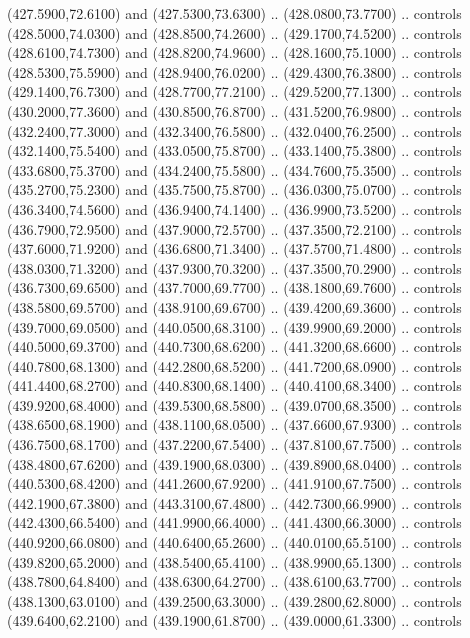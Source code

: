 {\begin{scope}[y=0.80pt, x=0.80pt, yscale=-1, xscale=1, inner sep=0pt, outer sep=0pt, #1]
      (427.5900,72.6100) and (427.5300,73.6300) .. (428.0800,73.7700) .. controls
      (428.5000,74.0300) and (428.8500,74.2600) .. (429.1700,74.5200) .. controls
      (428.6100,74.7300) and (428.8200,74.9600) .. (428.1600,75.1000) .. controls
      (428.5300,75.5900) and (428.9400,76.0200) .. (429.4300,76.3800) .. controls
      (429.1400,76.7300) and (428.7700,77.2100) .. (429.5200,77.1300) .. controls
      (430.2000,77.3600) and (430.8500,76.8700) .. (431.5200,76.9800) .. controls
      (432.2400,77.3000) and (432.3400,76.5800) .. (432.0400,76.2500) .. controls
      (432.1400,75.5400) and (433.0500,75.8700) .. (433.1400,75.3800) .. controls
      (433.6800,75.3700) and (434.2400,75.5800) .. (434.7600,75.3500) .. controls
      (435.2700,75.2300) and (435.7500,75.8700) .. (436.0300,75.0700) .. controls
      (436.3400,74.5600) and (436.9400,74.1400) .. (436.9900,73.5200) .. controls
      (436.7900,72.9500) and (437.9000,72.5700) .. (437.3500,72.2100) .. controls
      (437.6000,71.9200) and (436.6800,71.3400) .. (437.5700,71.4800) .. controls
      (438.0300,71.3200) and (437.9300,70.3200) .. (437.3500,70.2900) .. controls
      (436.7300,69.6500) and (437.7000,69.7700) .. (438.1800,69.7600) .. controls
      (438.5800,69.5700) and (438.9100,69.6700) .. (439.4200,69.3600) .. controls
      (439.7000,69.0500) and (440.0500,68.3100) .. (439.9900,69.2000) .. controls
      (440.5000,69.3700) and (440.7300,68.6200) .. (441.3200,68.6600) .. controls
      (440.7800,68.1300) and (442.2800,68.5200) .. (441.7200,68.0900) .. controls
      (441.4400,68.2700) and (440.8300,68.1400) .. (440.4100,68.3400) .. controls
      (439.9200,68.4000) and (439.5300,68.5800) .. (439.0700,68.3500) .. controls
      (438.6500,68.1900) and (438.1100,68.0500) .. (437.6600,67.9300) .. controls
      (436.7500,68.1700) and (437.2200,67.5400) .. (437.8100,67.7500) .. controls
      (438.4800,67.6200) and (439.1900,68.0300) .. (439.8900,68.0400) .. controls
      (440.5300,68.4200) and (441.2600,67.9200) .. (441.9100,67.7500) .. controls
      (442.1900,67.3800) and (443.3100,67.4800) .. (442.7300,66.9900) .. controls
      (442.4300,66.5400) and (441.9900,66.4000) .. (441.4300,66.3000) .. controls
      (440.9200,66.0800) and (440.6400,65.2600) .. (440.0100,65.5100) .. controls
      (439.8200,65.2000) and (438.5400,65.4100) .. (438.9900,65.1300) .. controls
      (438.7800,64.8400) and (438.6300,64.2700) .. (438.6100,63.7700) .. controls
      (438.1300,63.0100) and (439.2500,63.3000) .. (439.2800,62.8000) .. controls
      (439.6400,62.2100) and (439.1900,61.8700) .. (439.0000,61.3300) .. controls

\end{scope}}

